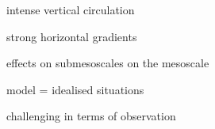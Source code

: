 intense vertical circulation

strong horizontal gradients

effects on submesoscales on the mesoscale

model = idealised situations

challenging in terms of observation